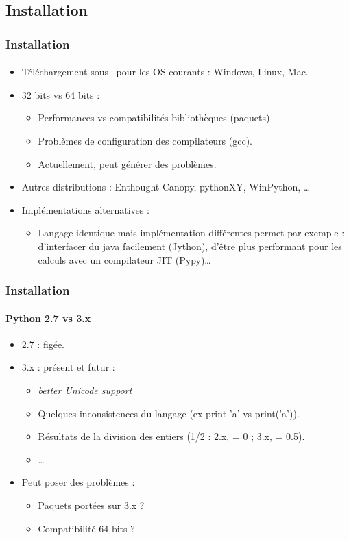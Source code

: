 \subsection{Installation}
\begin{frame}
\frametitle{Installation}
\framesubtitle{}
\begin{itemize}
 \item Téléchargement sous \urlPython\ pour les OS courants : Windows, Linux, Mac. 
 \item 32 bits vs 64 bits : 
  \begin{itemize}
   \small
   \item Performances vs compatibilités bibliothèques (paquets) 
   \item Problèmes de configuration des compilateurs (gcc).
   \item Actuellement, peut générer des problèmes. 
  \end{itemize}
 \item Autres distributions : Enthought Canopy, pythonXY, WinPython, \dots 
 \item Implémentations alternatives : 
 \begin{itemize}
  \small
  \item Langage identique mais implémentation différentes permet par exemple : d'interfacer du java facilement (Jython), d'être plus performant pour les calculs avec un compilateur JIT (Pypy)\dots
 \end{itemize}
\end{itemize}
\end{frame}
\begin{frame}
\frametitle{Installation}
\framesubtitle{Python 2.7 vs 3.x}

\begin{itemize}
\item 2.7 : figée.
\item 3.x : présent et futur : 
\begin{itemize}
 \item {\it better Unicode support}
 \item Quelques inconsistences du langage (ex print 'a' vs print('a')).  
 \item Résultats de la division des entiers (1/2 : 2.x, = 0 ; 3.x, = 0.5). 
 \item \dots
\end{itemize}
\item Peut poser des problèmes :
\begin{itemize}
 \item Paquets portées sur 3.x ?
 \item Compatibilité 64 bits ? 
\end{itemize}
\end{itemize}
\end{frame}


